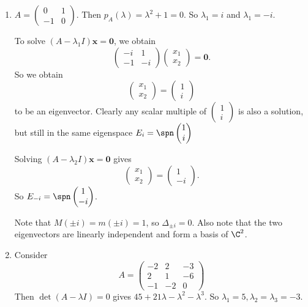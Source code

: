 \documentclass[a4paper]{article}
\begin{document}
\begin{eg}\leavevmode
  \begin{enumerate}
    \item $A = \begin{pmatrix} 0 & 1\\
        -1 & 0
      \end{pmatrix}$. Then $p_A(\lambda) = \lambda^2 + 1 = 0$. So $\lambda_1 = i$ and $\lambda_1 = -i$.

      To solve $(A - \lambda_1 I)\mathbf{x} = \mathbf{0}$, we obtain
      \[
        \begin{pmatrix}
          -i & 1\\-1 & -i
        \end{pmatrix}
        \begin{pmatrix}
          x_1\\x_2
        \end{pmatrix}
        = \mathbf{0}.
      \]
      So we obtain
      \[
        \begin{pmatrix}
          x_1\\x_2
        \end{pmatrix} =
        \begin{pmatrix}
          1\\i
        \end{pmatrix}
      \]
      to be an eigenvector. Clearly any scalar multiple of $\begin{pmatrix}
        1\\i
      \end{pmatrix}$ is also a solution, but still in the same eigenspace $E_i = \spn \begin{pmatrix}
        1\\i
      \end{pmatrix}$

      Solving $(A - \lambda_2I)\mathbf{x} = \mathbf{0}$ gives 
      \[
        \begin{pmatrix}
          x_1\\x_2
        \end{pmatrix} =
        \begin{pmatrix}
          1\\-i
        \end{pmatrix}.
      \]
      So $E_{-i} = \spn
      \begin{pmatrix}
        1\\-i
      \end{pmatrix}$.

      Note that $M(\pm i) = m(\pm i) = 1$, so $\Delta_{\pm i} = 0$. Also note that the two eigenvectors are linearly independent and form a basis of $\C^2$.
    \item Consider
      \[
        A = \begin{pmatrix}
          -2 & 2 & -3\\
          2 & 1 & -6\\
          -1 & -2 & 0
        \end{pmatrix}
      \]
      Then $\det(A - \lambda I) = 0$ gives $45 + 21\lambda - \lambda^2 - \lambda^3$. So $\lambda_1 = 5, \lambda_2 = \lambda_3 = -3$.


\end{enumerate}
\end{eg}
\end{document}
